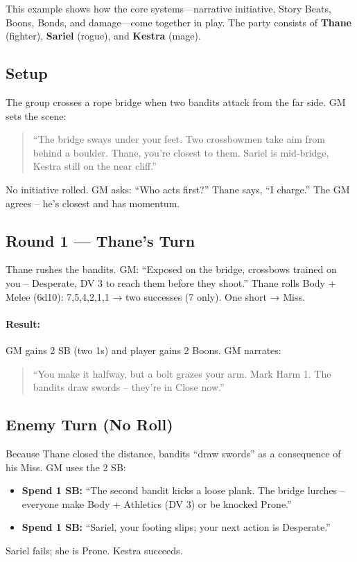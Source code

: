 \clearpage
\begin{tcolorbox}[colback=black!3!white,colframe=black!40!white,title={Encounter in Action: The Ambush at Raven’s Ford}]
\label{box:ambush-example}
This example shows how the core systems—narrative initiative, Story Beats, Boons, Bonds, and damage—come together in play. The party consists of \textbf{Thane} (fighter), \textbf{Sariel} (rogue), and \textbf{Kestra} (mage).

\subsection*{Setup}
The group crosses a rope bridge when two bandits attack from the far side. GM sets the scene:
\begin{quote}
“The bridge sways under your feet. Two crossbowmen take aim from behind a boulder. Thane, you’re closest to them. Sariel is mid‑bridge, Kestra still on the near cliff.”
\end{quote}
No initiative rolled. GM asks: “Who acts first?” Thane says, “I charge.” The GM agrees – he’s closest and has momentum.

\subsection*{Round 1 — Thane’s Turn}
Thane rushes the bandits. GM: “Exposed on the bridge, crossbows trained on you – Desperate, DV 3 to reach them before they shoot.” Thane rolls Body + Melee (6d10): 7,5,4,2,1,1 → two successes (7 only). One short → Miss.

\paragraph{Result:} GM gains 2 SB (two 1s) and player gains 2 Boons. GM narrates:
\begin{quote}
“You make it halfway, but a bolt grazes your arm. Mark Harm 1. The bandits draw swords – they’re in Close now.”
\end{quote}

\subsection*{Enemy Turn (No Roll)}
Because Thane closed the distance, bandits “draw swords” as a consequence of his Miss. GM uses the 2 SB:
\begin{itemize}
  \item \textbf{Spend 1 SB:} “The second bandit kicks a loose plank. The bridge lurches – everyone make Body + Athletics (DV 3) or be knocked Prone.”
  \item \textbf{Spend 1 SB:} “Sariel, your footing slips; your next action is Desperate.”
\end{itemize}
Sariel fails; she is Prone. Kestra succeeds.


\end{tcolorbox}
